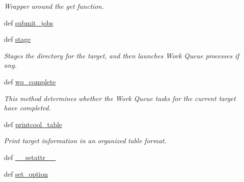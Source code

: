 \begin{DoxyCompactItemize}
\begin{DoxyCompactList}\small\item\em Wrapper around the get function. \end{DoxyCompactList}\item 
def \hyperlink{classforcebalance_1_1target_1_1Target_a78cd29b94cbcc201eed99c78aaef46a4}{submit\-\_\-jobs}
\item 
def \hyperlink{classforcebalance_1_1target_1_1Target_af8d2a4658c87841e40296795aec478bb}{stage}
\begin{DoxyCompactList}\small\item\em Stages the directory for the target, and then launches Work Queue processes if any. \end{DoxyCompactList}\item 
def \hyperlink{classforcebalance_1_1target_1_1Target_af6099ec09486213869dba2491bd8ea04}{wq\-\_\-complete}
\begin{DoxyCompactList}\small\item\em This method determines whether the Work Queue tasks for the current target have completed. \end{DoxyCompactList}\item 
def \hyperlink{classforcebalance_1_1target_1_1Target_ac30a4e9d7d9fe06f7caefa5f7cfab09b}{printcool\-\_\-table}
\begin{DoxyCompactList}\small\item\em Print target information in an organized table format. \end{DoxyCompactList}\item 
def \hyperlink{classforcebalance_1_1BaseClass_a0c851d413c3b2f30561b72a46771bcff}{\-\_\-\-\_\-setattr\-\_\-\-\_\-}
\item 
def \hyperlink{classforcebalance_1_1BaseClass_a73e9a37a7632e79eb99f49bd15aced45}{set\-\_\-option}
\end{DoxyCompactItemize}
